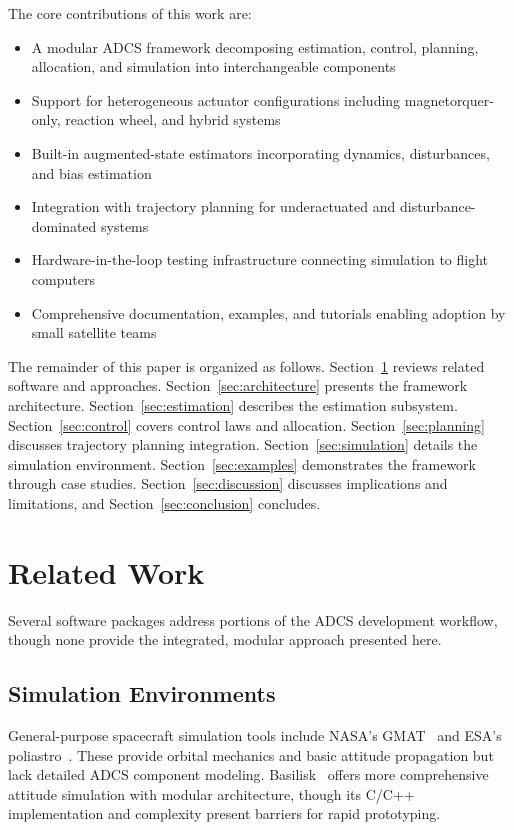 \documentclass[conference]{IEEEtran}
\begin{document}
The core contributions of this work are:

\begin{itemize}
    \item A modular ADCS framework decomposing estimation, control, planning, allocation, and simulation into interchangeable components
    \item Support for heterogeneous actuator configurations including magnetorquer-only, reaction wheel, and hybrid systems
    \item Built-in augmented-state estimators incorporating dynamics, disturbances, and bias estimation
    \item Integration with trajectory planning for underactuated and disturbance-dominated systems
    \item Hardware-in-the-loop testing infrastructure connecting simulation to flight computers
    \item Comprehensive documentation, examples, and tutorials enabling adoption by small satellite teams
\end{itemize}

The remainder of this paper is organized as follows. Section~\ref{sec:related_work} reviews related software and approaches. Section~\ref{sec:architecture} presents the framework architecture. Section~\ref{sec:estimation} describes the estimation subsystem. Section~\ref{sec:control} covers control laws and allocation. Section~\ref{sec:planning} discusses trajectory planning integration. Section~\ref{sec:simulation} details the simulation environment. Section~\ref{sec:examples} demonstrates the framework through case studies. Section~\ref{sec:discussion} discusses implications and limitations, and Section~\ref{sec:conclusion} concludes.


\section{Related Work}\label{sec:related_work}

Several software packages address portions of the ADCS development workflow, though none provide the integrated, modular approach presented here.

\subsection{Simulation Environments}\label{subsec:related_simulation}

General-purpose spacecraft simulation tools include NASA's GMAT~\cite{gmat} and ESA's poliastro~\cite{poliastro}. These provide orbital mechanics and basic attitude propagation but lack detailed ADCS component modeling. Basilisk~\cite{basilisk} offers more comprehensive attitude simulation with modular architecture, though its C/C++ implementation and complexity present barriers for rapid prototyping.
\end{document}
